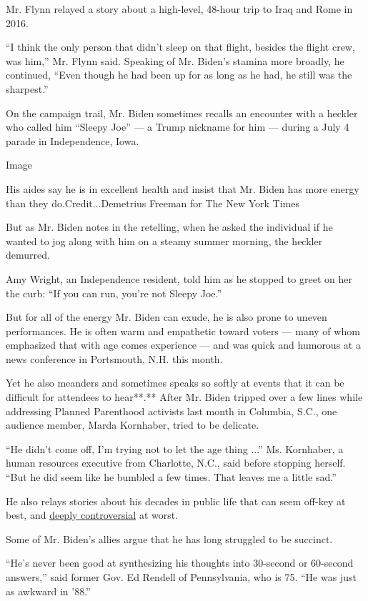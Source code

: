 Mr. Flynn relayed a story about a high-level, 48-hour trip to Iraq and
Rome in 2016.

``I think the only person that didn't sleep on that flight, besides the
flight crew, was him,'' Mr. Flynn said. Speaking of Mr. Biden's stamina
more broadly, he continued, ``Even though he had been up for as long as
he had, he still was the sharpest.''

On the campaign trail, Mr. Biden sometimes recalls an encounter with a
heckler who called him ``Sleepy Joe'' --- a Trump nickname for him ---
during a July 4 parade in Independence, Iowa.

Image

His aides say he is in excellent health and insist that Mr. Biden has
more energy than they do.Credit...Demetrius Freeman for The New York
Times

But as Mr. Biden notes in the retelling, when he asked the individual if
he wanted to jog along with him on a steamy summer morning, the heckler
demurred.

Amy Wright, an Independence resident, told him as he stopped to greet on
her the curb: ``If you can run, you're not Sleepy Joe.''

But for all of the energy Mr. Biden can exude, he is also prone to
uneven performances. He is often warm and empathetic toward voters ---
many of whom emphasized that with age comes experience --- and was quick
and humorous at a news conference in Portsmouth, N.H. this month.

Yet he also meanders and sometimes speaks so softly at events that it
can be difficult for attendees to hear**.** After Mr. Biden tripped over
a few lines while addressing Planned Parenthood activists last month in
Columbia, S.C., one audience member, Marda Kornhaber, tried to be
delicate.

``He didn't come off, I'm trying not to let the age thing ...'' Ms.
Kornhaber, a human resources executive from Charlotte, N.C., said before
stopping herself. ``But he did seem like he bumbled a few times. That
leaves me a little sad.''

He also relays stories about his decades in public life that can seem
off-key at best, and
\href{https://www.nytimes3xbfgragh.onion/2019/06/19/us/politics/biden-segregationists.html}{deeply
controversial} at worst.

Some of Mr. Biden's allies argue that he has long struggled to be
succinct.

``He's never been good at synthesizing his thoughts into 30-second or
60-second answers,'' said former Gov. Ed Rendell of Pennsylvania, who is
75. ``He was just as awkward in '88.''

